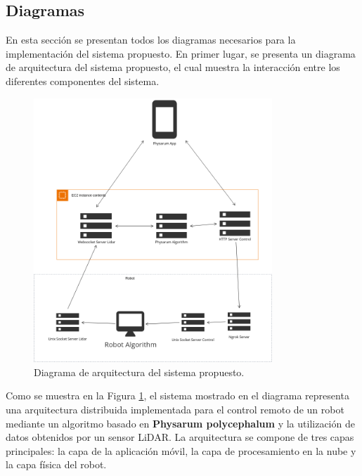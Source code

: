 \clearpage
\subsection{Diagramas} %
\label{sub:Diagramas}


        En esta secci\'on se presentan todos los diagramas necesarios para la implementaci\'on del sistema propuesto.
        En primer lugar, se presenta un diagrama de arquitectura del sistema propuesto, el cual muestra la interacci\'on 
        entre los diferentes componentes del sistema. 
        \vskip 0.5cm
            \begin{figure}[htbp]
                \centering
                \includegraphics[width=0.8\textwidth]{images/desarrollo/diagramas/ArquitecturaSistema.png}
                \caption{Diagrama de arquitectura del sistema propuesto.}
                \label{fig:ArquitecturaSistema}
            \end{figure}
        \vskip 0.5cm
        Como se muestra en la Figura \ref{fig:ArquitecturaSistema}, el sistema mostrado en el diagrama representa una arquitectura distribuida implementada para el control remoto 
        de un robot mediante un algoritmo basado en \textbf{Physarum polycephalum} y la utilizaci\'on de datos obtenidos por un sensor LiDAR. 
        La arquitectura se compone de tres capas principales: la capa de la aplicaci\'on m\'ovil, la capa de procesamiento en la nube 
        y la capa f\'isica del robot.

